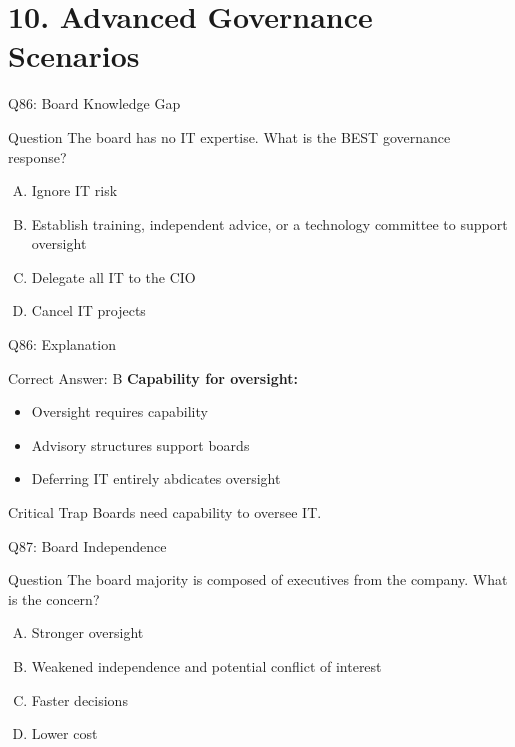 \documentclass{beamer}
\begin{document}
	\section{10. Advanced Governance Scenarios}
	
	\begin{frame}{Q86: Board Knowledge Gap}
		\begin{block}{Question}
			The board has no IT expertise. What is the BEST governance response?
		\end{block}
		\begin{enumerate}[(A)]
			\item Ignore IT risk
			\item Establish training, independent advice, or a technology committee to support oversight
			\item Delegate all IT to the CIO
			\item Cancel IT projects
		\end{enumerate}
	\end{frame}
	
	\begin{frame}{Q86: Explanation}
		\begin{block}{Correct Answer: B}
			\textbf{Capability for oversight:}
			\begin{itemize}
				\item Oversight requires capability
				\item Advisory structures support boards
				\item Deferring IT entirely abdicates oversight
			\end{itemize}
		\end{block}
		\begin{alertblock}{Critical Trap}
			Boards need capability to oversee IT.
		\end{alertblock}
	\end{frame}
	
	\begin{frame}{Q87: Board Independence}
		\begin{block}{Question}
			The board majority is composed of executives from the company. What is the concern?
		\end{block}
		\begin{enumerate}[(A)]
			\item Stronger oversight
			\item Weakened independence and potential conflict of interest
			\item Faster decisions
			\item Lower cost
		\end{enumerate}
	\end{frame}
	
\end{document}
